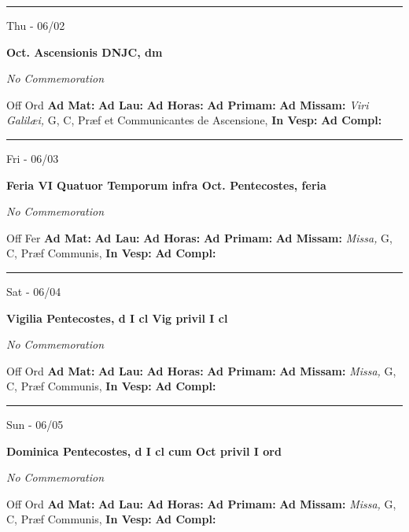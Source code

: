 \documentclass[letterpaper, 10pt]{article}
\begin{document}
\hrule
\begin{center}
Thu - 06/02
\end{center}\textbf{ \large Oct. Ascensionis DNJC, \textnormal{\normalsize dm}}

\textit{No Commemoration}\begin{justify}
Off Ord
\textbf{Ad Mat: }
\textbf{Ad Lau: }
\textbf{Ad Horas: }
\textbf{Ad Primam: }
\textbf{Ad Missam:} \textit{Viri Galilæi, } G, C, Præf et Communicantes de Ascensione, 
\textbf{In Vesp: }
\textbf{Ad Compl: }\end{justify}



\hrule
\begin{center}
Fri - 06/03
\end{center}\textbf{ \large Feria VI Quatuor Temporum infra Oct. Pentecostes, \textnormal{\normalsize feria}}

\textit{No Commemoration}\begin{justify}
Off Fer
\textbf{Ad Mat: }
\textbf{Ad Lau: }
\textbf{Ad Horas: }
\textbf{Ad Primam: }
\textbf{Ad Missam:} \textit{Missa, } G, C, Præf Communis, 
\textbf{In Vesp: }
\textbf{Ad Compl: }\end{justify}



\hrule
\begin{center}
Sat - 06/04
\end{center}\textbf{ \large Vigilia Pentecostes, \textnormal{\normalsize d I cl Vig privil I cl}}

\textit{No Commemoration}\begin{justify}
Off Ord
\textbf{Ad Mat: }
\textbf{Ad Lau: }
\textbf{Ad Horas: }
\textbf{Ad Primam: }
\textbf{Ad Missam:} \textit{Missa, } G, C, Præf Communis, 
\textbf{In Vesp: }
\textbf{Ad Compl: }\end{justify}



\hrule
\begin{center}
Sun - 06/05
\end{center}\textbf{ \large Dominica Pentecostes, \textnormal{\normalsize d I cl cum Oct privil I ord}}

\textit{No Commemoration}\begin{justify}
Off Ord
\textbf{Ad Mat: }
\textbf{Ad Lau: }
\textbf{Ad Horas: }
\textbf{Ad Primam: }
\textbf{Ad Missam:} \textit{Missa, } G, C, Præf Communis, 
\textbf{In Vesp: }
\textbf{Ad Compl: }\end{justify}
\end{document}
